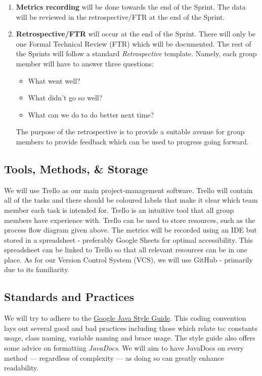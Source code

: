 \documentclass[12pt]{article}
\begin{document}
\begin{enumerate}
    \item \textbf{Metrics recording} will be done towards the end of the Sprint. The data will be reviewed in the retrospective/FTR at the end of the Sprint. 
    \item \textbf{Retrospective/FTR} will occur at the end of the Sprint. There will only be one Formal Technical Review (FTR) which will be documented. The rest of the Sprints will follow a standard \emph{Retrospective} template. Namely, each group member will have to answer three questions: 
    \begin{itemize}
    \item What went well? 
    \item What didn't go so well? 
    \item What can we do to do better next time? 
    \end{itemize}
    The purpose of the retrospective is to provide a suitable avenue for group members to provide feedback which can be used to progress going forward.
\end{enumerate}

\newpage
 
\subsection{Tools, Methods, \& Storage}
 We will use Trello as our main project-management software. Trello will contain all of the tasks and there should be coloured labels that make it clear which team member each task is intended for. Trello is an intuitive tool that all group members have experience with. Trello can be used to store resources, such as the process flow diagram given above. The metrics will be recorded using an IDE but stored in a spreadsheet - preferably Google Sheets for optimal accessibility. This spreadsheet can be linked to Trello so that all relevant resources can be in one place. As for our Version Control System (VCS), we will use GitHub - primarily due to its familiarity.
 
\subsection{Standards and Practices}
\label{practices}
We will try to adhere to the \underline{\href{https://google.github.io/styleguide/javaguide.html}{Google Java Style Guide}}. This coding convention lays out several good and bad practices including those which relate to: constants usage, class naming, variable naming and brace usage. The style guide also offers some advice on formatting \emph{JavaDocs}. We will aim to have JavaDocs on every method --- regardless of complexity --- as doing so can greatly enhance readability.
\end{document}
